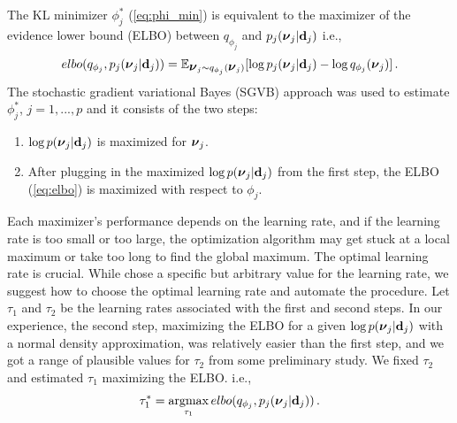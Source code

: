 \documentclass[%
 reprint,
 amsmath,amssymb,
 aps,
]{revtex4-2}
\DeclareMathOperator{\argmax}{argmax} %
\begin{document}
The KL minimizer $\phi^*_j$ (\ref{eq:phi_min}) is equivalent to the maximizer of the evidence lower bound (ELBO) between $q_{\phi_j}$ and $p_j(\mbox{\boldmath $\nu$}_j|{\bf d}_j)$ i.e.,  
\begin{equation}\label{eq:elbo}
elbo(q_{\phi_j},p_j(\mbox{\boldmath $\nu$}_j|{\bf d}_j)) = \mathbb{E}_{\mbox{\boldmath $\nu$}_j\sim q_{\phi_j}(\mbox{\boldmath $\nu$}_j)}[\log p_j(\mbox{\boldmath $\nu$}_j|{\bf d}_j)-\log q_{\phi_j}(\mbox{\boldmath $\nu$}_j)] \,.    
\end{equation}
The stochastic gradient variational Bayes (SGVB) approach was used to estimate $\phi^*_j$, $j=1,...,p$ and it consists of the two steps:
\begin{enumerate}
    \item 
 $\log p(\mbox{\boldmath $\nu$}_j|{\bf d}_j)$ is maximized for $\mbox{\boldmath $\nu$}_j$. 
 \item After plugging in  the maximized $\log p(\mbox{\boldmath $\nu$}_j|{\bf d}_j)$ from the first step, the ELBO (\ref{eq:elbo}) is maximized with respect to $\phi_j$. 
 \end{enumerate}
 Each maximizer's performance depends on the learning rate, and if the learning rate is too small or too large, the optimization algorithm may get stuck at a local maximum or take too long to find the global maximum. The optimal learning rate is crucial. While \cite{Hu2023} chose a specific but arbitrary value for the learning rate,
we suggest how to choose the optimal learning rate and automate the procedure. Let $\tau_1$ and $\tau_2$ be the learning rates associated with the first and second steps. In our experience, the second step, maximizing the ELBO for a given $\log p(\mbox{\boldmath $\nu$}_j|{\bf d}_j)$ with a normal density approximation, was relatively easier than the first step, and we got a range of plausible values for $\tau_2$ from some preliminary study. We fixed $\tau_2$ and estimated $\tau_1$ maximizing the ELBO. i.e., 
\[ \tau_1^* = \argmax_{\tau_1} elbo(q_{\phi_j},p_j(\bnu_j|\d_j)) \,. \] 
\end{document}
